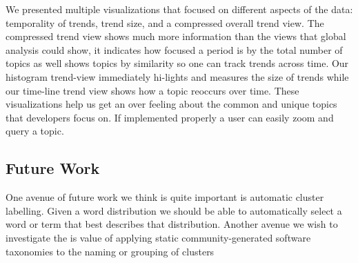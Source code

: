 \documentclass[times, 10pt,twocolumn]{article}
\begin{document}


We presented multiple visualizations that focused on different aspects
of the data: temporality of trends, trend size, and a compressed
overall trend view. The compressed trend view shows much more
information than the views that global analysis could show, it
indicates how focused a period is by the total number of topics as
well shows topics by similarity so one can track trends across time.
Our histogram trend-view immediately hi-lights and measures the size of
trends while our time-line trend view shows how a topic reoccurs over
time. These visualizations help us get an over feeling about the
common and unique topics that developers focus on. If implemented
properly a user can easily zoom and query a topic.


\subsection{ Future Work}

One avenue of future work we think is quite important is automatic
cluster labelling. Given a word distribution we should be able to
automatically select a word or term that best describes that distribution.
Another avenue we wish to investigate the is value of applying
static community-generated software taxonomies to the naming or
grouping of clusters







%


\end{document}
